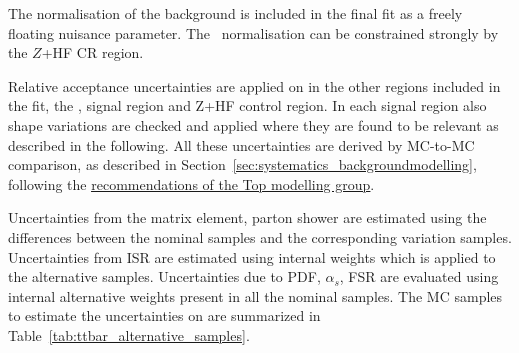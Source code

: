 The normalisation of the \ttbar background is included in the final fit as a freely floating nuisance parameter. The \ttbar\ normalisation can be constrained 
strongly by the $Z$+HF CR region.

Relative acceptance uncertainties are applied on \ttbar in the other regions included in the fit, the \lephad, \hadhad signal region and Z+HF control region. In each signal region also shape variations are checked and applied where they are found to be relevant as described in the following. All these uncertainties are derived by MC-to-MC comparison, as described in Section~\ref{sec:systematics_backgroundmodelling}, following the \href{https://twiki.cern.ch/twiki/bin/view/AtlasProtected/TopMCSystematicsR21}{\underline{recommendations of the Top modelling group}}. 

Uncertainties from the matrix element, parton shower are estimated using the differences between the nominal samples and the corresponding variation samples. 
Uncertainties from ISR are estimated using internal weights which is applied to the alternative samples.
Uncertainties due to PDF, $\alpha_s$, FSR are evaluated using internal alternative weights present in all the \ttbar nominal samples. 
The MC samples to estimate the uncertainties on \ttbar are summarized in Table~\ref{tab:ttbar_alternative_samples}.

